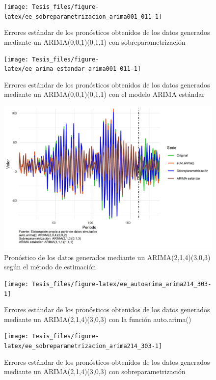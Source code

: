 \documentclass[
]{article}
\begin{document}
\begin{figure}[H]
\texttt{[image: Tesis\_files/figure-latex/ee\_sobreparametrizacion\_arima001\_011-1]} \caption{Errores estándar de los pronósticos obtenidos de los datos generados mediante un ARIMA(0,0,1)(0,1,1) con sobreparametrización}\label{fig:ee_sobreparametrizacion_arima001_011}
\end{figure}

\begin{figure}[H]
\texttt{[image: Tesis\_files/figure-latex/ee\_arima\_estandar\_arima001\_011-1]} \caption{Errores estándar de los pronósticos obtenidos de los datos generados mediante un ARIMA(0,0,1)(0,1,1) con el modelo ARIMA estándar}\label{fig:ee_arima_estandar_arima001_011}
\end{figure}

\begin{figure}[H]
\includegraphics[width=1\linewidth,height=1\textheight]{Tesis_files/figure-latex/pronostico_arima214_303-1} \caption{Pronóstico de los datos generados mediante un ARIMA(2,1,4)(3,0,3) según el método de estimación}\label{fig:pronostico_arima214_303}
\end{figure}

\begin{figure}[H]
\texttt{[image: Tesis\_files/figure-latex/ee\_autoarima\_arima214\_303-1]} \caption{Errores estándar de los pronósticos obtenidos de los datos generados mediante un ARIMA(2,1,4)(3,0,3) con la función auto.arima()}\label{fig:ee_autoarima_arima214_303}
\end{figure}

\begin{figure}[H]
\texttt{[image: Tesis\_files/figure-latex/ee\_sobreparametrizacion\_arima214\_303-1]} \caption{Errores estándar de los pronósticos obtenidos de los datos generados mediante un ARIMA(2,1,4)(3,0,3) con sobreparametrización}\label{fig:ee_sobreparametrizacion_arima214_303}
\end{figure}
\end{document}
